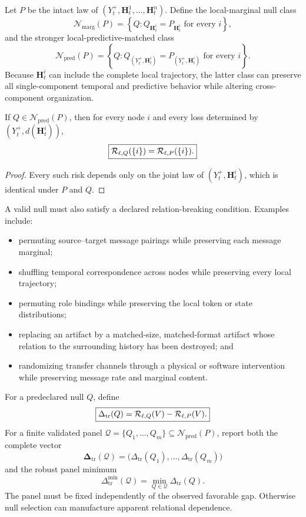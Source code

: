 Let \(P\) be the intact law of
\((Y_t^+,\mathbf H_t^1,\ldots,\mathbf H_t^n)\). Define the local-marginal null
class
\[
\mathcal N_{\mathrm{marg}}(P)
=
\left\{
Q:
Q_{\mathbf H_t^i}=P_{\mathbf H_t^i}
\text{ for every }i
\right\},
\]
and the stronger local-predictive-matched class
\[
\boxed{
\mathcal N_{\mathrm{pred}}(P)
=
\left\{
Q:
Q_{(Y_t^+,\mathbf H_t^i)}
=
P_{(Y_t^+,\mathbf H_t^i)}
\text{ for every }i
\right\}.
}
\]
Because \(\mathbf H_t^i\) can include the complete local trajectory, the latter
class can preserve all single-component temporal and predictive behavior while
altering cross-component organization.

\begin{proposition}
\label{prop:local-risk-null}
If \(Q\in\mathcal N_{\mathrm{pred}}(P)\), then for every node \(i\) and every
loss determined by \((Y_t^+,d(\mathbf H_t^i))\),
\[
\boxed{
\mathcal R_{\ell,Q}(\{i\})
=
\mathcal R_{\ell,P}(\{i\}).
}
\]
\end{proposition}

\begin{proof}
Every such risk depends only on the joint law of
\((Y_t^+,\mathbf H_t^i)\), which is identical under \(P\) and \(Q\).
\end{proof}

A valid null must also satisfy a declared relation-breaking condition. Examples
include:
\begin{itemize}
\item permuting source--target message pairings while preserving each message
 marginal;
\item shuffling temporal correspondence across nodes while preserving every
 local trajectory;
\item permuting role bindings while preserving the local token or state
 distributions;
\item replacing an artifact by a matched-size, matched-format artifact whose
 relation to the surrounding history has been destroyed; and
\item randomizing transfer channels through a physical or software
 intervention while preserving message rate and marginal content.
\end{itemize}

For a predeclared null \(Q\), define
\[
\boxed{
\Delta_{\mathrm{tr}}(Q)
=
\mathcal R_{\ell,Q}(V)
-
\mathcal R_{\ell,P}(V).
}
\]
For a finite validated panel
\(\mathcal Q=\{Q_1,\ldots,Q_m\}\subseteq\mathcal N_{\mathrm{pred}}(P)\), report
both the complete vector
\[
\boldsymbol\Delta_{\mathrm{tr}}(\mathcal Q)
=
\bigl(
\Delta_{\mathrm{tr}}(Q_1),\ldots,
\Delta_{\mathrm{tr}}(Q_m)
\bigr)
\]
and the robust panel minimum
\[
\Delta_{\mathrm{tr}}^{\min}(\mathcal Q)
=
\min_{Q\in\mathcal Q}\Delta_{\mathrm{tr}}(Q).
\]
The panel must be fixed independently of the observed favorable gap. Otherwise
null selection can manufacture apparent relational dependence.


